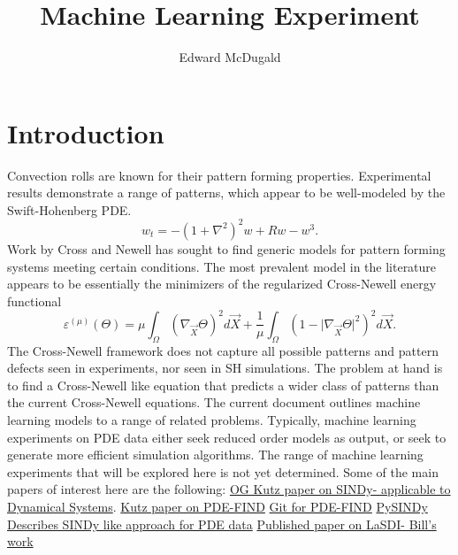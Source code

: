 \documentclass[12pt]{article}
\title{Machine Learning Experiment}
\author{Edward McDugald}
\newcounter{problem}
\begin{document}
\maketitle
\section{Introduction}
Convection rolls are known for their pattern forming properties. 
Experimental results demonstrate a range of patterns, which appear to be well-modeled by the Swift-Hohenberg PDE.
\[
    w_t = -(1+\nabla^2)^2w + Rw - w^3.
\] 
Work by Cross and Newell has sought to find generic models for pattern forming systems meeting certain conditions.
The most prevalent model in the literature appears to be essentially the minimizers of the regularized Cross-Newell energy functional
\[
    \varepsilon^{(\mu)}(\Theta) = \mu \int_{\Omega}(\nabla_{\vec{X}}\Theta)^2d\vec{X}+\frac{1}{\mu}\int_{\Omega}\left(1-\lvert \nabla_{\vec{X}}\Theta\rvert^2\right)^2d\vec{X}.
\]
The Cross-Newell framework does not capture all possible patterns and pattern defects seen in experiments, nor seen in SH simulations. The problem at hand is to find a Cross-Newell like equation that predicts a wider class of patterns than the current Cross-Newell equations.\newline
The current document outlines machine learning models to a range of related problems. Typically, machine learning experiments on PDE data either seek reduced order models as output, or seek to generate more efficient simulation algorithms. The range of machine learning experiments that will be explored here is not yet determined. Some of the main papers of interest here are the following: \newline
 \href{https://www.pnas.org/doi/pdf/10.1073/pnas.1517384113}{OG Kutz paper on SINDy- applicable to Dynamical Systems}.\newline
 \href{https://www.science.org/doi/pdf/10.1126/sciadv.1602614}{Kutz paper on PDE-FIND}\newline
 \href{https://github.com/snagcliffs/PDE-FIND}{Git for PDE-FIND}\newline
 \href{https://github.com/dynamicslab/pysindy}{PySINDy}\newline
    \href{https://www.pnas.org/doi/pdf/10.1073/pnas.1906995116}{Describes SINDy like approach for PDE data}\newline
    \href{https://reader.elsevier.com/reader/sd/pii/S0045782522004807?token=828D185F06DE28418D9E46B544E846EEDC227470A1436A8191877A3EC18DC832E4B81EE95D31BCC28E5B0B0B7D00373C&originRegion=us-east-1&originCreation=20220928051957}{Published paper on LaSDI- Bill's work}\newline
\end{document}

